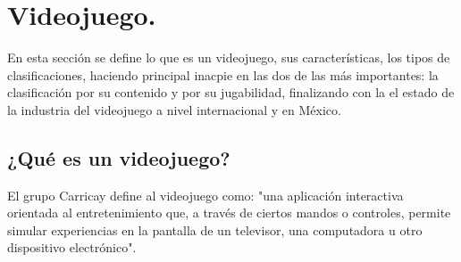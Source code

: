 \section{Videojuego.}\label{Videojuego}
	En esta sección se define lo que es un videojuego, sus características, los tipos de 
	clasificaciones, haciendo principal inacpie en las dos de las más importantes: la
	 clasificación por su contenido y por su jugabilidad, finalizando con la el 
	 estado de la industria del videojuego a nivel internacional y en México.
	
	\subsection{¿Qué es un videojuego?}\label{Defvideojuego}
El grupo Carricay define al videojuego como: "una aplicación interactiva orientada
 al entretenimiento que, a través de ciertos mandos o controles, permite simular 
 experiencias en la pantalla de un televisor, una computadora u otro dispositivo 
 electrónico"\cite{Ref_DefVideo}.
	
